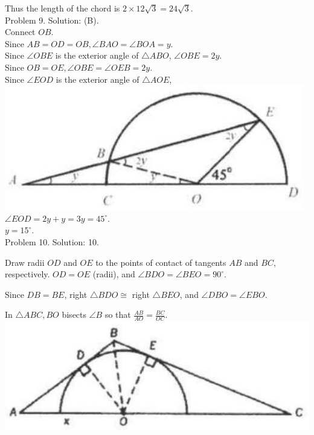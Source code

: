 \documentclass[10pt]{article}
\begin{document}
Thus the length of the chord is \(2 \times 12 \sqrt{3}=24 \sqrt{3}\).\\
Problem 9. Solution: (B).\\
Connect \(O B\).\\
Since \(A B=O D=O B, \angle B A O=\angle B O A=y\).\\
Since \(\angle O B E\) is the exterior angle of \(\triangle A B O\), \(\angle O B E=2 y\).\\
Since \(O B=O E, \angle O B E=\angle O E B=2 y\).\\
Since \(\angle E O D\) is the exterior angle of \(\triangle A O E\),\\
\includegraphics[max width=\textwidth, center]{2025_04_17_97bc1f7e44d93c271a88g-159(2)}\\
\(\angle E O D=2 y+y=3 y=45^{\circ}\).\\
\(y=15^{\circ}\).\\
Problem 10. Solution: 10.


Draw radii \(O D\) and \(O E\) to the points of contact of tangents \(A B\) and \(B C\), respectively. \(O D=O E\) (radii), and \(\angle B D O=\angle B E O=90^{\circ}\).

Since \(D B=B E\), right \(\triangle B D O \cong\) right \(\triangle B E O\), and \(\angle D B O=\angle E B O\).

In \(\triangle A B C, B O\) bisects \(\angle B\) so that \(\frac{A B}{A O}=\frac{B C}{O C}\).\\
\includegraphics[max width=\textwidth, center]{2025_04_17_97bc1f7e44d93c271a88g-160}
\end{document}
